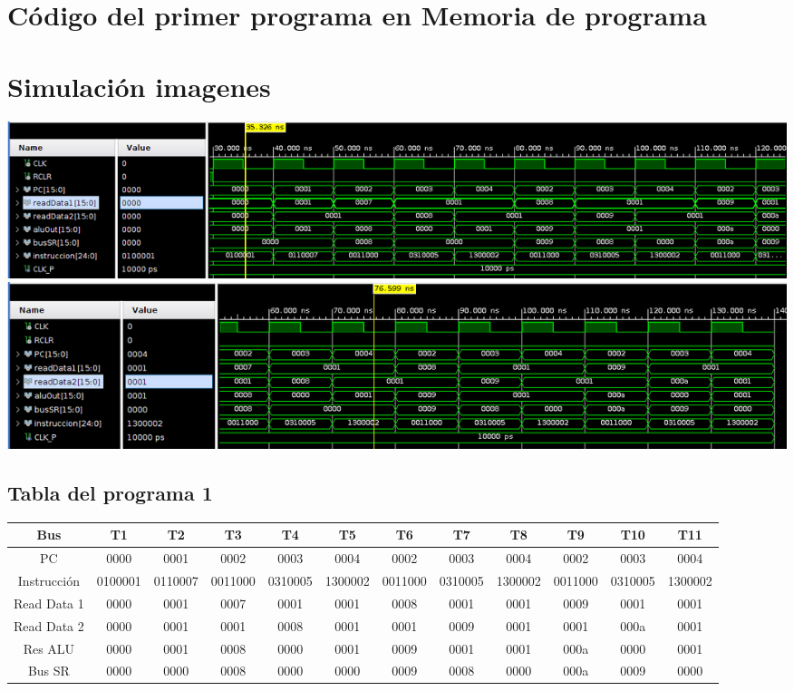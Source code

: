 \documentclass[8pt,executivepaper]{article}
\begin{document}
\section{Código del primer programa en Memoria de programa}
\begin{center}
  
\end{center}
\section{Simulación imagenes}
\begin{center}
  \includegraphics[scale=0.35]{img/programa0-0.png}\\
  \includegraphics[scale=0.35]{img/programa0-1.png}
\end{center}
\begin{landscape}
  \section{Tabla del programa 1}
  \begin{tabular}{|c|c|c|c|c|c|c|c|c|c|c|c|}
    \hline
    Bus & T1 & T2 & T3 & T4 & T5 & T6 & T7 & T8 & T9 & T10 & T11\\
    \hline
    PC & 0000 & 0001 & 0002 & 0003 & 0004 & 0002 & 0003 & 0004 & 0002 & 0003 & 0004 \\
    \hline
    Instrucción & 0100001 & 0110007 & 0011000 & 0310005 & 1300002 & 0011000 & 0310005 & 1300002 & 0011000 & 0310005 & 1300002 \\
    \hline
    Read Data 1 & 0000 & 0001 & 0007 & 0001 & 0001 & 0008 & 0001 & 0001 & 0009 & 0001 & 0001\\
    \hline
    Read Data 2 & 0000 & 0001 & 0001 & 0008 & 0001 & 0001 & 0009 & 0001 & 0001 & 000a & 0001\\
    \hline
    Res ALU & 0000 & 0001 & 0008 & 0000 & 0001 & 0009 & 0001 & 0001 & 000a & 0000 & 0001 \\
    \hline
    Bus SR & 0000 & 0000 & 0008 & 0000 & 0000 & 0009 & 0008 & 0000 & 000a & 0009 & 0000\\
    \hline
  \end{tabular}
\end{landscape}
\end{document}
